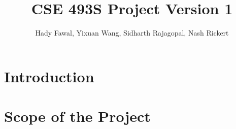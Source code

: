 \documentclass{article}
\title{CSE 493S Project Version 1}
\author{Hady Fawal, Yixuan Wang, Sidharth Rajagopal, Nash Rickert}
\newcommand{\mycomment}[1]{}
\begin{document}
\maketitle

\section{Introduction}

\mycomment{
Instructions:
A  few  sentences  placing  the  work  in  context. Limit it to a few paragraphs at most; if your report is on reproducing a piece of work, you do not have to motivate that work. However, it should be clear enough what the original paper is about and what its contributions are.

For original work, we expect a short elevator pitch with motivation.

For a summary of a line of theoretical work, we expect a short summary about this line of work. This can start out from a paper with a key theoretical result, or a recent paper which highlights an extension of an established research direction.}

\section{Scope of the Project}
\end{document}
